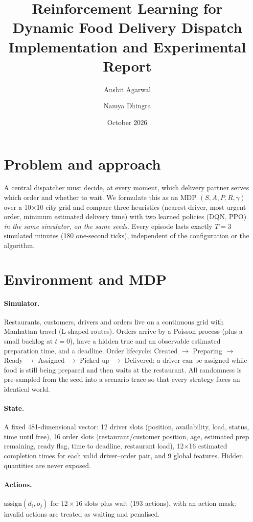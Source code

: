 \documentclass[11pt]{article}
\title{Reinforcement Learning for Dynamic Food Delivery Dispatch\\\large Implementation and Experimental Report}
\author{Anshit Agarwal \and Namya Dhingra}
\date{October 2026}
\begin{document}
\maketitle

\section{Problem and approach}
A central dispatcher must decide, at every moment, which delivery partner serves which order and
whether to wait. We formulate this as an MDP $(S,A,P,R,\gamma)$ over a 10$\times$10 city grid and
compare three heuristics (nearest driver, most urgent order, minimum estimated delivery time) with
two learned policies (DQN, PPO) \emph{in the same simulator, on the same seeds}. Every episode lasts
exactly $T=3$ simulated minutes (180 one-second ticks), independent of the configuration or the
algorithm.

\section{Environment and MDP}
\paragraph{Simulator.} Restaurants, customers, drivers and orders live on a continuous grid with Manhattan
travel (L-shaped routes). Orders arrive by a Poisson process (plus a small backlog at $t=0$), have a hidden
true and an observable estimated preparation time, and a deadline. Order lifecycle:
Created $\to$ Preparing $\to$ Ready $\to$ Assigned $\to$ Picked up $\to$ Delivered; a driver can be
assigned while food is still being prepared and then waits at the restaurant. All randomness is
pre-sampled from the seed into a scenario trace so that every strategy faces an identical world.

\paragraph{State.} A fixed 481-dimensional vector: 12 driver slots (position, availability, load, status,
time until free), 16 order slots (restaurant/customer position, age, estimated prep remaining, ready flag,
time to deadline, restaurant load), 12$\times$16 estimated completion times for each valid driver--order pair,
and 9 global features. Hidden quantities are never exposed.

\paragraph{Actions.} $\text{assign}(d_i,o_j)$ for $12\times16$ slots plus $\text{wait}$ (193 actions), with an
action mask; invalid actions are treated as waiting and penalised.
\end{document}
